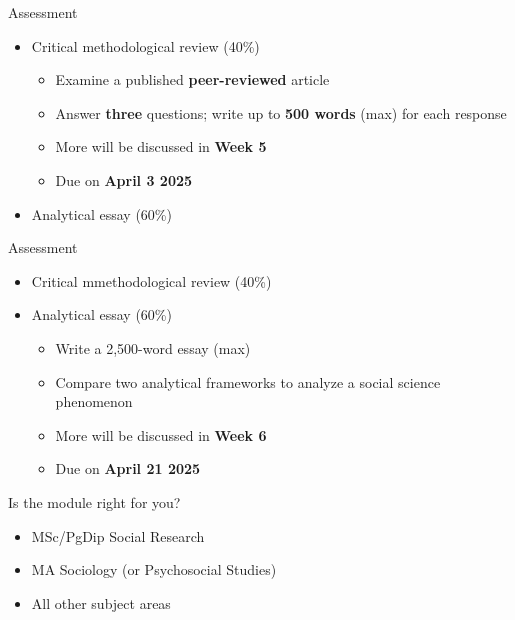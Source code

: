 \documentclass[
  10pt,
  ignorenonframetext,
]{beamer}
\begin{document}
\begin{frame}{Assessment}
\protect\hypertarget{assessment-1}{}
\begin{itemize}
  \item Critical methodological review (40\%)
  \vspace{0.1cm}
  \begin{itemize}
    \item Examine a published \textbf{peer-reviewed} article
    \item Answer \textbf{three} questions; write up to \textbf{500 words} (max) for each response
    \item More will be discussed in \textbf{Week 5}
    \item Due on \textbf{April 3 2025}
  \end{itemize}
  \vspace{0.7cm}
  \item Analytical essay (60\%)
\end{itemize}
\end{frame}

\begin{frame}{Assessment}
\protect\hypertarget{assessment-2}{}
\begin{itemize}
  \item Critical mmethodological review (40\%)
  \vspace{0.7cm}
  \item Analytical essay (60\%)
  \vspace{0.1cm}
  \begin{itemize}
    \item Write a 2,500-word essay (max)
    \item Compare two analytical frameworks to analyze a social science phenomenon
    \item More will be discussed in \textbf{Week 6}
    \item Due on \textbf{April 21 2025}
  \end{itemize}
\end{itemize}
\end{frame}

\begin{frame}{Is the module right for you?}
\protect\hypertarget{is-the-module-right-for-you}{}
\begin{itemize}
  \item MSc/PgDip Social Research
  \vpsace{1cm}
  \item MA Sociology (or Psychosocial Studies)
  \vpsace{1cm}
  \item All other subject areas
\end{itemize}
\end{frame}
\end{document}
